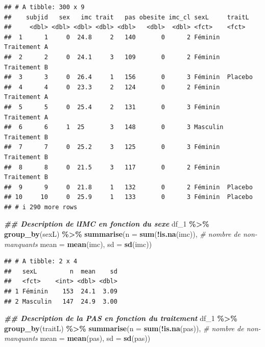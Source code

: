 \documentclass[
]{book}
\newenvironment{Shaded}{\begin{snugshade}}{\end{snugshade}}
\newcommand{\AttributeTok}[1]{\textcolor[rgb]{0.13,0.29,0.53}{#1}}
\newcommand{\CommentTok}[1]{\textcolor[rgb]{0.56,0.35,0.01}{\textit{#1}}}
\newcommand{\DocumentationTok}[1]{\textcolor[rgb]{0.56,0.35,0.01}{\textbf{\textit{#1}}}}
\newcommand{\FunctionTok}[1]{\textcolor[rgb]{0.13,0.29,0.53}{\textbf{#1}}}
\newcommand{\NormalTok}[1]{#1}
\newcommand{\SpecialCharTok}[1]{\textcolor[rgb]{0.81,0.36,0.00}{\textbf{#1}}}
\begin{document}
\begin{verbatim}
## # A tibble: 300 x 9
##    subjid   sex   imc trait   pas obesite imc_cl sexL     traitL      
##     <dbl> <dbl> <dbl> <dbl> <dbl>   <dbl>  <dbl> <fct>    <fct>       
##  1      1     0  24.8     2   140       0      2 Féminin  Traitement A
##  2      2     0  24.1     3   109       0      2 Féminin  Traitement B
##  3      3     0  26.4     1   156       0      3 Féminin  Placebo     
##  4      4     0  23.3     2   124       0      2 Féminin  Traitement A
##  5      5     0  25.4     2   131       0      3 Féminin  Traitement A
##  6      6     1  25       3   148       0      3 Masculin Traitement B
##  7      7     0  25.2     3   125       0      3 Féminin  Traitement B
##  8      8     0  21.5     3   117       0      2 Féminin  Traitement B
##  9      9     0  21.8     1   132       0      2 Féminin  Placebo     
## 10     10     0  25.9     1   133       0      3 Féminin  Placebo     
## # i 290 more rows
\end{verbatim}

\begin{Shaded}
\begin{Highlighting}[]
\DocumentationTok{\#\# Description de l\textquotesingle{}IMC en fonction du sexe}
\NormalTok{df\_1 }\SpecialCharTok{\%\textgreater{}\%}
  \FunctionTok{group\_by}\NormalTok{(sexL) }\SpecialCharTok{\%\textgreater{}\%}
  \FunctionTok{summarise}\NormalTok{(}\AttributeTok{n =} \FunctionTok{sum}\NormalTok{(}\SpecialCharTok{!}\FunctionTok{is.na}\NormalTok{(imc)), }\CommentTok{\# nombre de non{-}manquants}
            \AttributeTok{mean =} \FunctionTok{mean}\NormalTok{(imc), }
            \AttributeTok{sd =} \FunctionTok{sd}\NormalTok{(imc))}
\end{Highlighting}
\end{Shaded}

\begin{verbatim}
## # A tibble: 2 x 4
##   sexL         n  mean    sd
##   <fct>    <int> <dbl> <dbl>
## 1 Féminin    153  24.1  3.09
## 2 Masculin   147  24.9  3.00
\end{verbatim}

\begin{Shaded}
\begin{Highlighting}[]
\DocumentationTok{\#\# Description de la PAS en fonction du traitement}
\NormalTok{df\_1 }\SpecialCharTok{\%\textgreater{}\%}
  \FunctionTok{group\_by}\NormalTok{(traitL) }\SpecialCharTok{\%\textgreater{}\%}
  \FunctionTok{summarise}\NormalTok{(}\AttributeTok{n =} \FunctionTok{sum}\NormalTok{(}\SpecialCharTok{!}\FunctionTok{is.na}\NormalTok{(pas)), }\CommentTok{\# nombre de non{-}manquants}
            \AttributeTok{mean =} \FunctionTok{mean}\NormalTok{(pas), }
            \AttributeTok{sd =} \FunctionTok{sd}\NormalTok{(pas))}
\end{Highlighting}
\end{Shaded}
\end{document}
